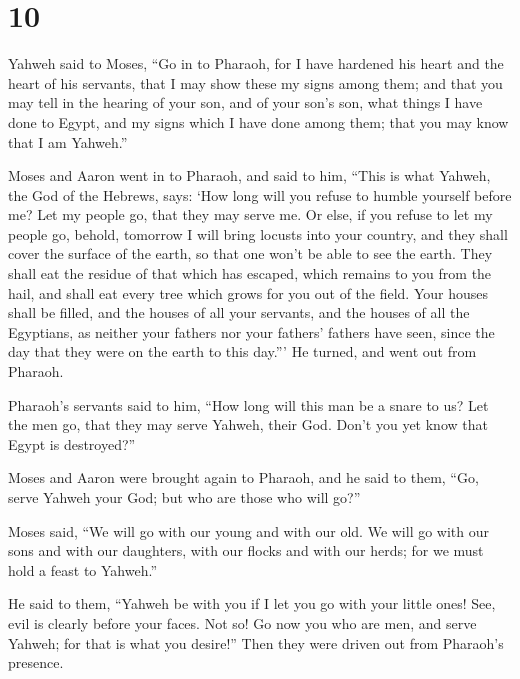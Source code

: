 \hypertarget{section-9}{%
\section{10}\label{section-9}}

 Yahweh said to Moses, ``Go in to Pharaoh, for I have
hardened his heart and the heart of his servants, that I may show these
my signs among them;  and that you may tell in the hearing
of your son, and of your son's son, what things I have done to Egypt,
and my signs which I have done among them; that you may know that I am
Yahweh.''

 Moses and Aaron went in to Pharaoh, and said to him,
``This is what Yahweh, the God of the Hebrews, says: `How long will you
refuse to humble yourself before me? Let my people go, that they may
serve me.  Or else, if you refuse to let my people go,
behold, tomorrow I will bring locusts into your country, 
and they shall cover the surface of the earth, so that one won't be able
to see the earth. They shall eat the residue of that which has escaped,
which remains to you from the hail, and shall eat every tree which grows
for you out of the field.  Your houses shall be filled,
and the houses of all your servants, and the houses of all the
Egyptians, as neither your fathers nor your fathers' fathers have seen,
since the day that they were on the earth to this day.''' He turned, and
went out from Pharaoh.

 Pharaoh's servants said to him, ``How long will this man
be a snare to us? Let the men go, that they may serve Yahweh, their God.
Don't you yet know that Egypt is destroyed?''

 Moses and Aaron were brought again to Pharaoh, and he
said to them, ``Go, serve Yahweh your God; but who are those who will
go?''

 Moses said, ``We will go with our young and with our old.
We will go with our sons and with our daughters, with our flocks and
with our herds; for we must hold a feast to Yahweh.''

 He said to them, ``Yahweh be with you if I let you go
with your little ones! See, evil is clearly before your faces.
 Not so! Go now you who are men, and serve Yahweh; for
that is what you desire!'' Then they were driven out from Pharaoh's
presence.

